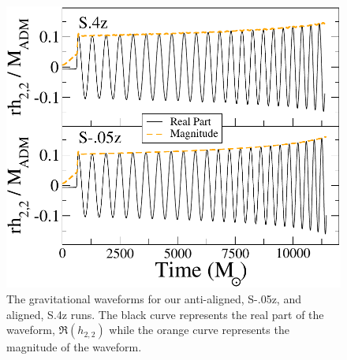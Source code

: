 \documentclass[aps,prd,amsmath,floatfix
,twocolumn
,superscriptaddress,nofootinbib,showpacs]{revtex4-1}
\theoremstyle{plain} \newtheorem{thm}{Theorem} \newtheorem{lem}{Lemma}
\newcommand{\red}[1]{\textcolor{Red}{#1}}
\begin{document}
\begin{figure}
\includegraphics[width=0.95\columnwidth]{AlignedGW}
\caption { {\label{fig:AlignedGW}} The gravitational waveforms for our anti-aligned, S-.05z, and aligned, S.4z runs. The black curve represents the real part of the waveform, $\Re(h_{2,2})$ while the orange curve represents the magnitude of the waveform.}
\end{figure}

\end{document}
